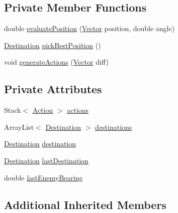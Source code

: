 \subsection*{Private Member Functions}
\begin{DoxyCompactItemize}
\item 
double \hyperlink{classmega_1_1boirlerplate_1_1_movement_predictive_a2dca88b9a008815e15976c654cb6c1c1}{evaluate\+Position} (\hyperlink{classmega_1_1boirlerplate_1_1_vector}{Vector} position, double angle)
\item 
\hyperlink{classmega_1_1boirlerplate_1_1_movement_predictive_1_1_destination}{Destination} \hyperlink{classmega_1_1boirlerplate_1_1_movement_predictive_a43a4ae4a71d9e3a36313d316f7ae537f}{pick\+Best\+Position} ()
\item 
void \hyperlink{classmega_1_1boirlerplate_1_1_movement_predictive_a71f4b152fc0a396c65b0af8bd9ede736}{generate\+Actions} (\hyperlink{classmega_1_1boirlerplate_1_1_vector}{Vector} diff)
\end{DoxyCompactItemize}
\subsection*{Private Attributes}
\begin{DoxyCompactItemize}
\item 
Stack$<$ \hyperlink{classmega_1_1boirlerplate_1_1_movement_predictive_1_1_action}{Action} $>$ \hyperlink{classmega_1_1boirlerplate_1_1_movement_predictive_a65e6ad38f9fb6062584415126f356b29}{actions}
\item 
Array\+List$<$ \hyperlink{classmega_1_1boirlerplate_1_1_movement_predictive_1_1_destination}{Destination} $>$ \hyperlink{classmega_1_1boirlerplate_1_1_movement_predictive_a73ba3ddff4eb6cfc7119ab67065bbc1a}{destinations}
\item 
\hyperlink{classmega_1_1boirlerplate_1_1_movement_predictive_1_1_destination}{Destination} \hyperlink{classmega_1_1boirlerplate_1_1_movement_predictive_a5cf7cc310d1712671dc59eb40f7ad191}{destination}
\item 
\hyperlink{classmega_1_1boirlerplate_1_1_movement_predictive_1_1_destination}{Destination} \hyperlink{classmega_1_1boirlerplate_1_1_movement_predictive_a4192d3dde44bf7604c1e5aa42e0799cb}{last\+Destination}
\item 
double \hyperlink{classmega_1_1boirlerplate_1_1_movement_predictive_ae2b44f98d4bf2f87abd4a8c136792aa4}{last\+Enemy\+Bearing}
\end{DoxyCompactItemize}
\subsection*{Additional Inherited Members}


